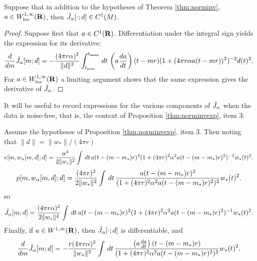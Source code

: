 \begin{theorem}
  \label{thm:diffobj}
  Suppose that in addition to the hypotheses of Theorem
  \ref{thm:norminv}, $a \in W^{1,\infty}_{\rm loc}({\bf R})$, then $\tilde{J}_{\alpha}[\cdot;d]
  \in C^1(M)$.
\end{theorem}

\begin{proof}
Suppose first that $a \in C^1({\bf R})$. Differentiation under the integral sign  
  yields the expression for its derivative:
\begin{equation}
  \label{eqn:dexpjgen}
  \frac{d}{dm}\tilde{J}_{\alpha}[m;d] = -\frac{(4 \pi r \alpha)^2}{\|d\|^2} \int_{t_{\rm min}}^{t_{\rm max}} \,dt \, 
  \left(a\frac{da}{dt}\right)(t-mr)(1+(4\pi r \alpha 
  a(t-mr))^2)^{-2}d(t)^2. 
\end{equation}
For $a \in W^{1,\infty}_{\rm loc}({\bf R})$ a limiting argument shows that the
same expression gives the derivative of $\tilde{J}_{\alpha}$.
\end{proof}

It will be useful to record expressions for the various components of
$\tilde{J}_{\alpha}$ when the data is noise-free, that is, the context of
Proposition \ref{thm:norminvexp}, item 3:
\begin{corollary}
  \label{thm:epjnonoise}
  Assume the hypotheses of Proposition \ref{thm:norminvexp}, item
  3. Then noting that $\|d\| = \|w_*\|/(4 \pi r)$
\begin{equation}
  \label{eqn:residnorm}
  e[m,w_{\alpha}[m,d];d] 
= \frac{\alpha^4}{2\|w_*\|^2}\int\,dt\,a(t-(m-m_*)r)^4(1+(4\pi r)^2 \alpha^2 
    a(t-(m-m_*)r)^2)^{-2}w_*(t)^2.
\end{equation}
\begin{equation}
  \label{eqn:anninorm}
  p[m,w_{\alpha}[m,d];d] = \frac{(4\pi r)^2}{2\|w_*\|^2}\int \,dt\,  
  \frac{a(t-(m-m_*)r)^2}{(1+ (4\pi r)^2\alpha^2
    a(t-(m-m_*)r)^2)^{2}}w_*(t)^2.
\end{equation}
so 
\begin{equation}
\label{eqn:expjnonoise}
\tilde{J}_{\alpha}[m;d] = \frac{(4\pi r \alpha)^2}{2\|w_*\|^2}\int\,dt\,a(t-(m-m_*)r)^2(1+(4\pi r)^2 \alpha^2 
  a(t-(m-m_*)r)^2)^{-1}w_*(t)^2. 
\end{equation}
Finally, if $a \in W^{1,\infty}({\bf R})$, then $\tilde{J}_{\alpha}[\cdot;d]$ is differentiable, and 
\begin{equation}
  \label{eqn:dexpjnonoise}
  \frac{d}{dm}\tilde{J}_{\alpha}[m;d] = -\frac{r (4\pi r \alpha)^2}{\|w_*\|^2} \int \,dt \, 
  \frac{\left(a\frac{da}{dt}\right)(t-(m-m_*)r)}{(1+(4\pi r)^2 \alpha^2 
  a(t-(m-m_*)r)^2)^{2}}w_*(t)^2. 
\end{equation}
\end{corollary}


